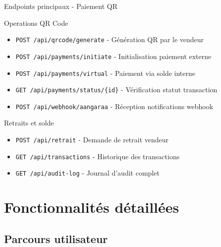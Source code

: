 \documentclass[aspectratio=169,9pt,demo]{beamer}
\begin{document}
\begin{frame}{Endpoints principaux - Paiement QR}
\begin{block}{Operations QR Code}
\begin{itemize}
    \item \texttt{POST /api/qrcode/generate} - Génération QR par le vendeur
    \item \texttt{POST /api/payments/initiate} - Initialisation paiement externe
    \item \texttt{POST /api/payments/virtual} - Paiement via solde interne
    \item \texttt{GET /api/payments/status/\{id\}} - Vérification statut transaction
    \item \texttt{POST /api/webhook/aangaraa} - Réception notifications webhook
\end{itemize}
\end{block}

\begin{block}{Retraits et solde}
\begin{itemize}
    \item \texttt{POST /api/retrait} - Demande de retrait vendeur
    \item \texttt{GET /api/transactions} - Historique des transactions
    \item \texttt{GET /api/audit-log} - Journal d'audit complet
\end{itemize}
\end{block}
\end{frame}

\section{\Large Fonctionnalités détaillées}
\subsection{\large Parcours utilisateur}
\end{document}
